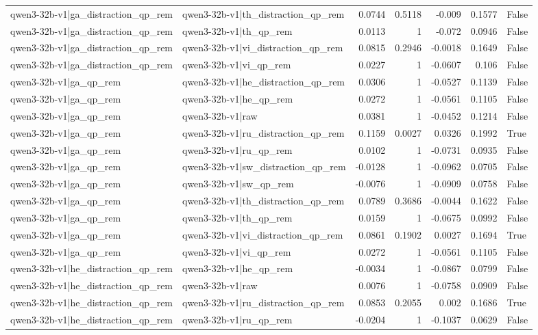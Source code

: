 \begin{table}
\begin{tabular}{l l r r r r l}
qwen3-32b-v1|ga_distraction_qp_rem & qwen3-32b-v1|th_distraction_qp_rem & 0.0744 & 0.5118 & -0.009 & 0.1577 & False \\
qwen3-32b-v1|ga_distraction_qp_rem & qwen3-32b-v1|th_qp_rem & 0.0113 & 1 & -0.072 & 0.0946 & False \\
qwen3-32b-v1|ga_distraction_qp_rem & qwen3-32b-v1|vi_distraction_qp_rem & 0.0815 & 0.2946 & -0.0018 & 0.1649 & False \\
qwen3-32b-v1|ga_distraction_qp_rem & qwen3-32b-v1|vi_qp_rem & 0.0227 & 1 & -0.0607 & 0.106 & False \\
qwen3-32b-v1|ga_qp_rem & qwen3-32b-v1|he_distraction_qp_rem & 0.0306 & 1 & -0.0527 & 0.1139 & False \\
qwen3-32b-v1|ga_qp_rem & qwen3-32b-v1|he_qp_rem & 0.0272 & 1 & -0.0561 & 0.1105 & False \\
qwen3-32b-v1|ga_qp_rem & qwen3-32b-v1|raw & 0.0381 & 1 & -0.0452 & 0.1214 & False \\
qwen3-32b-v1|ga_qp_rem & qwen3-32b-v1|ru_distraction_qp_rem & 0.1159 & 0.0027 & 0.0326 & 0.1992 & True \\
qwen3-32b-v1|ga_qp_rem & qwen3-32b-v1|ru_qp_rem & 0.0102 & 1 & -0.0731 & 0.0935 & False \\
qwen3-32b-v1|ga_qp_rem & qwen3-32b-v1|sw_distraction_qp_rem & -0.0128 & 1 & -0.0962 & 0.0705 & False \\
qwen3-32b-v1|ga_qp_rem & qwen3-32b-v1|sw_qp_rem & -0.0076 & 1 & -0.0909 & 0.0758 & False \\
qwen3-32b-v1|ga_qp_rem & qwen3-32b-v1|th_distraction_qp_rem & 0.0789 & 0.3686 & -0.0044 & 0.1622 & False \\
qwen3-32b-v1|ga_qp_rem & qwen3-32b-v1|th_qp_rem & 0.0159 & 1 & -0.0675 & 0.0992 & False \\
qwen3-32b-v1|ga_qp_rem & qwen3-32b-v1|vi_distraction_qp_rem & 0.0861 & 0.1902 & 0.0027 & 0.1694 & True \\
qwen3-32b-v1|ga_qp_rem & qwen3-32b-v1|vi_qp_rem & 0.0272 & 1 & -0.0561 & 0.1105 & False \\
qwen3-32b-v1|he_distraction_qp_rem & qwen3-32b-v1|he_qp_rem & -0.0034 & 1 & -0.0867 & 0.0799 & False \\
qwen3-32b-v1|he_distraction_qp_rem & qwen3-32b-v1|raw & 0.0076 & 1 & -0.0758 & 0.0909 & False \\
qwen3-32b-v1|he_distraction_qp_rem & qwen3-32b-v1|ru_distraction_qp_rem & 0.0853 & 0.2055 & 0.002 & 0.1686 & True \\
qwen3-32b-v1|he_distraction_qp_rem & qwen3-32b-v1|ru_qp_rem & -0.0204 & 1 & -0.1037 & 0.0629 & False \\

\end{tabular}
\end{table}
